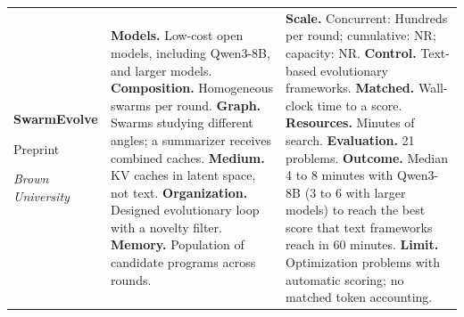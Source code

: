 \begin{longtable}{@{}>{\raggedright\arraybackslash}p{}>{\raggedright\arraybackslash}p{}>{\raggedright\arraybackslash}p{}@{}}
\textbf{SwarmEvolve}\par \citep{swarmevolve}\par Preprint\par\emph{Brown University} & \textbf{Models.} Low-cost open models, including Qwen3-8B, and larger models. \textbf{Composition.} Homogeneous swarms per round. \textbf{Graph.} Swarms studying different angles; a summarizer receives combined caches. \textbf{Medium.} KV caches in latent space, not text. \textbf{Organization.} Designed evolutionary loop with a novelty filter. \textbf{Memory.} Population of candidate programs across rounds. & \textbf{Scale.} Concurrent: Hundreds per round; cumulative: NR; capacity: NR. \textbf{Control.} Text-based evolutionary frameworks. \textbf{Matched.} Wall-clock time to a score. \textbf{Resources.} Minutes of search. \textbf{Evaluation.} 21 problems. \textbf{Outcome.} Median 4 to 8 minutes with Qwen3-8B (3 to 6 with larger models) to reach the best score that text frameworks reach in 60 minutes. \textbf{Limit.} Optimization problems with automatic scoring; no matched token accounting. \\
\end{longtable}
\endgroup

